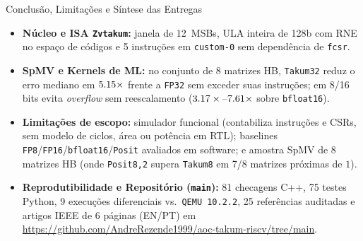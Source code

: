 \documentclass[aspectratio=169,10pt]{beamer}
\begin{document}
\begin{frame}{Conclusão, Limitações e Síntese das Entregas}
	\small
	\begin{itemize}
		\item \textbf{Núcleo e ISA \texttt{Zvtakum}:} janela de 12~MSBs, ULA inteira de 128b com RNE no espaço de códigos e 5 instruções em \texttt{custom-0} sem dependência de \texttt{fcsr}.
		\item \textbf{SpMV e Kernels de ML:} no conjunto de 8 matrizes HB, \texttt{Takum32} reduz o erro mediano em $5.15\times$ frente a \texttt{FP32} sem exceder suas instruções; em 8/16 bits evita \emph{overflow} sem reescalamento ($3.17\times\text{--}7.61\times$ sobre \texttt{bfloat16}).
		\item \textbf{Limitações de escopo:} simulador funcional (contabiliza instruções e CSRs, sem modelo de ciclos, área ou potência em RTL); baselines \texttt{FP8}/\texttt{FP16}/\texttt{bfloat16}/\texttt{Posit} avaliados em software; e amostra SpMV de 8 matrizes HB (onde \texttt{Posit8,2} supera \texttt{Takum8} em 7/8 matrizes próximas de $1$).
		\item \textbf{Reprodutibilidade e Repositório (\texttt{main}):} 81 checagens C++, 75 testes Python, 9 execuções diferenciais vs.\ \texttt{QEMU 10.2.2}, 25 referências auditadas e artigos IEEE de 6 páginas (EN/PT) em \url{https://github.com/AndreRezende1999/aoc-takum-riscv/tree/main}.
	\end{itemize}
\end{frame}
\end{document}
